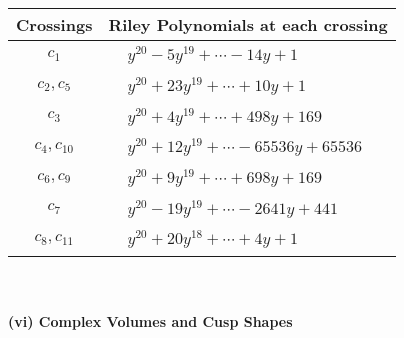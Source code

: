 \documentclass[1p]{elsarticle_modified}
\theoremstyle{definition}
\begin{document}
\begin{tabular}{m{50pt}|m{274pt}}
Crossings & \hspace{64pt}Riley Polynomials at each crossing \\
\hline $$\begin{aligned}c_{1}\end{aligned}$$&$\begin{aligned}
&y^{20}-5 y^{19}+\cdots-14 y+1
\end{aligned}$\\
\hline $$\begin{aligned}c_{2},c_{5}\end{aligned}$$&$\begin{aligned}
&y^{20}+23 y^{19}+\cdots+10 y+1
\end{aligned}$\\
\hline $$\begin{aligned}c_{3}\end{aligned}$$&$\begin{aligned}
&y^{20}+4 y^{19}+\cdots+498 y+169
\end{aligned}$\\
\hline $$\begin{aligned}c_{4},c_{10}\end{aligned}$$&$\begin{aligned}
&y^{20}+12 y^{19}+\cdots-65536 y+65536
\end{aligned}$\\
\hline $$\begin{aligned}c_{6},c_{9}\end{aligned}$$&$\begin{aligned}
&y^{20}+9 y^{19}+\cdots+698 y+169
\end{aligned}$\\
\hline $$\begin{aligned}c_{7}\end{aligned}$$&$\begin{aligned}
&y^{20}-19 y^{19}+\cdots-2641 y+441
\end{aligned}$\\
\hline $$\begin{aligned}c_{8},c_{11}\end{aligned}$$&$\begin{aligned}
&y^{20}+20 y^{18}+\cdots+4 y+1
\end{aligned}$\\
\hline
\end{tabular}\\~\\
\newpage\flushleft \textbf{(vi) Complex Volumes and Cusp Shapes}
\end{document}
